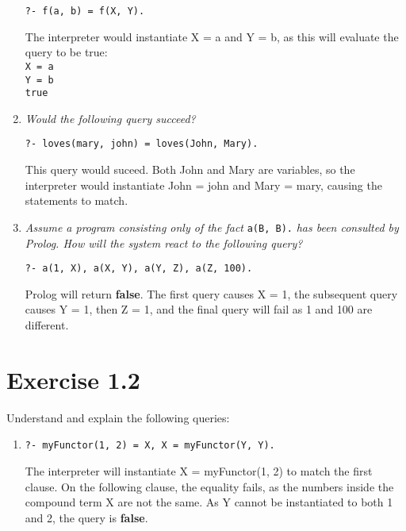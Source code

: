 \documentclass{report}
\newcommand{\code}[1]{\texttt{#1}}
\begin{document}
\begin{enumerate}[label=(\alph*)]
    \centerline{\code{?- f(a, b) = f(X, Y).}}
    
    The interpreter would instantiate X = a and Y = b, as this will evaluate the query to be true: \\
    \code{X = a} \\
    \code{Y = b} \\
    \code{true} \\

    \item \emph{Would the following query succeed?}
    
    \centerline{\code{?- loves(mary, john) = loves(John, Mary).}}

    This query would suceed. Both John and Mary are variables, so the interpreter would instantiate John = john and Mary = mary, causing the statements to match.

    \item \emph{Assume a program consisting only of the fact }  \code{a(B, B).} \emph{has been consulted by Prolog. How will the system react to the following query?}
    
    \centerline{\code{?- a(1, X), a(X, Y), a(Y, Z), a(Z, 100).}}

    Prolog will return \textbf{false}. The first query causes X = 1, the subsequent query causes Y = 1, then Z = 1, and the final query will fail as 1 and 100 are different.

\end{enumerate}

\section{\textbf{Exercise 1.2}}
Understand and explain the following queries:
\begin{enumerate}[label=(\alph*)]

    \item \code{?- myFunctor(1, 2) = X, X = myFunctor(Y, Y).}
    
    The interpreter will instantiate X = myFunctor(1, 2) to match the first clause. On the following clause, the equality fails, as the numbers inside the compound term X are not the same. As Y cannot be instantiated to both 1 and 2, the query is \textbf{false}.

\end{enumerate}
\end{document}
